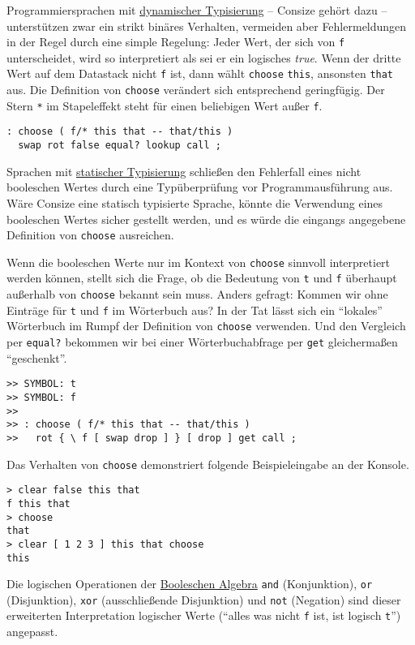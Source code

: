 Programmiersprachen mit \href{http://de.wikipedia.org/wiki/Dynamische\_Typisierung}{dynamischer Typisierung} -- Consize gehört dazu -- unterstützen zwar ein strikt binäres Verhalten, vermeiden aber Fehlermeldungen in der Regel durch eine simple Regelung: Jeder Wert, der sich von \verb|f| unterscheidet, wird so interpretiert als sei er ein logisches \emph{true}. Wenn der dritte Wert auf dem Datastack nicht \verb|f| ist, dann wählt \verb|choose| \verb|this|, ansonsten \verb|that| aus. Die Definition von \verb|choose| verändert sich entsprechend geringfügig. Der Stern \verb|*| im Stapeleffekt steht für einen beliebigen Wert außer \verb|f|.

\begin{verbatim}
: choose ( f/* this that -- that/this )
  swap rot false equal? lookup call ;
\end{verbatim} 

Sprachen mit \href{http://de.wikipedia.org/wiki/Statische\_Typisierung}{statischer Typisierung} schließen den Fehlerfall eines nicht booleschen Wertes durch eine Typüberprüfung vor Programmausführung aus. Wäre Consize eine statisch typisierte Sprache, könnte die Verwendung eines booleschen Wertes sicher gestellt werden, und es würde die eingangs angegebene Definition von \verb|choose| ausreichen.

Wenn die booleschen Werte nur im Kontext von \verb|choose| sinnvoll interpretiert werden können, stellt sich die Frage, ob die Bedeutung von \verb|t| und \verb|f| überhaupt außerhalb von \verb|choose| bekannt sein muss. Anders gefragt: Kommen wir ohne Einträge für \verb|t| und \verb|f| im Wörterbuch aus? In der Tat lässt sich ein "`lokales"' Wörterbuch im Rumpf der Definition von \verb|choose| verwenden. Und den Vergleich per \verb|equal?| bekommen wir bei einer Wörterbuchabfrage per \verb|get| gleichermaßen "`geschenkt"'.

\begin{verbatim}
>> SYMBOL: t
>> SYMBOL: f
>> 
>> : choose ( f/* this that -- that/this )
>>   rot { \ f [ swap drop ] } [ drop ] get call ;
\end{verbatim}

Das Verhalten von \verb|choose| demonstriert folgende Beispieleingabe an der Konsole.

\begin{verbatim}
> clear false this that
f this that
> choose
that
> clear [ 1 2 3 ] this that choose
this
\end{verbatim}

Die logischen Operationen der \href{http://de.wikipedia.org/wiki/Boolesche\_Algebra}{Booleschen Algebra} \verb|and| (Konjunktion), \verb|or| (Disjunktion), \verb|xor| (ausschließende Disjunktion) und \verb|not| (Negation) sind dieser erweiterten Interpretation logischer Werte ("`alles was nicht \verb|f| ist, ist logisch \verb|t|"') angepasst.

